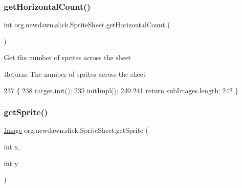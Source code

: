 \subsubsection{\texorpdfstring{get\+Horizontal\+Count()}{getHorizontalCount()}}
{\footnotesize\ttfamily int org.\+newdawn.\+slick.\+Sprite\+Sheet.\+get\+Horizontal\+Count (\begin{DoxyParamCaption}{ }\end{DoxyParamCaption})\hspace{0.3cm}{\ttfamily [inline]}}

Get the number of sprites across the sheet

\begin{DoxyReturn}{Returns}
The number of sprites across the sheet 
\end{DoxyReturn}

\begin{DoxyCode}
237                                     \{
238         \mbox{\hyperlink{classorg_1_1newdawn_1_1slick_1_1_sprite_sheet_a54e0b09e9140db02bc11ac22fff5d464}{target}}.\mbox{\hyperlink{classorg_1_1newdawn_1_1slick_1_1_image_a94d180c9218ba1444a0496a1898ec345}{init}}();
239         \mbox{\hyperlink{classorg_1_1newdawn_1_1slick_1_1_sprite_sheet_a66be61bdff9a452f365abe95d2b47da2}{initImpl}}();
240         
241         \textcolor{keywordflow}{return} \mbox{\hyperlink{classorg_1_1newdawn_1_1slick_1_1_sprite_sheet_a4aa6be08aecfbd439794ca984ce6e44c}{subImages}}.length;
242     \}
\end{DoxyCode}
\mbox{\label{classorg_1_1newdawn_1_1slick_1_1_sprite_sheet_af79773fd002b7f1b78ccbf52a8c60319}} 
\subsubsection{\texorpdfstring{get\+Sprite()}{getSprite()}}
{\footnotesize\ttfamily \mbox{\hyperlink{classorg_1_1newdawn_1_1slick_1_1_image}{Image}} org.\+newdawn.\+slick.\+Sprite\+Sheet.\+get\+Sprite (\begin{DoxyParamCaption}\item[{int}]{x,  }\item[{int}]{y }\end{DoxyParamCaption})\hspace{0.3cm}{\ttfamily [inline]}}

